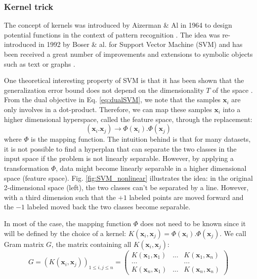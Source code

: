 \subsubsection{Kernel trick}
The concept of kernels was introduced by Aizerman \& Al in 1964 to design potential functions in the context of pattern recognition \cite{Aizerman1964}. The idea was re-introduced in 1992 by Boser \& al. for Support Vector Machine (SVM) and has been received a great number of improvements and extensions to symbolic objects such as text or graphs \cite{Boser1992}.

One theoretical interesting property of SVM is that it has been shown that the generalization error bound does not depend on the dimensionality $T$ of the space \cite{Schlkopf2013}. From the dual objective in Eq. \ref{eq:dualSVM}, we note that the samples $\textbf{x}_i$ are only involves in a dot-product. Therefore, we can map these samples $\textbf{x}_i$ into a higher dimensional hyperspace, called the feature space, through the replacement:
\begin{equation}
	(\textbf{x}_i . \textbf{x}_j) \rightarrow \Phi(\textbf{x}_i) . \Phi(\textbf{x}_j) 
\end{equation}
\noindent where $\Phi$ is the mapping function. The intuition behind is that for many datasets, it is not possible to find a hyperplan that can separate the two classes in the input space if the problem is not linearly separable. However, by applying a transformation $\Phi$, data might become linearly separable in a higher dimensional space (feature space). Fig. \ref{fig:SVM_nonlinear} illustrates the idea: in the original 2-dimensional space (left), the two classes can't be separated by a line. However, with a third dimension such that the $+1$ labeled points are moved forward and the $-1$ labeled moved back the two classes become separable.

In most of the case, the mapping function $\Phi$ does not need to be known since it will be defined by the choice of a kernel: $K(\textbf{x}_i,\textbf{x}_j)= \Phi(\textbf{x}_i) . \Phi(\textbf{x}_j)$. We call Gram matrix $G$, the matrix containing all $K(\textbf{x}_i,\textbf{x}_j)$:
\begin{equation*}
	G = (K(\textbf{x}_i,\textbf{x}_j))_{1 \leq i,j \leq n} = 
	\begin{pmatrix}
	K(\textbf{x}_1,\textbf{x}_1) & ... & K(\textbf{x}_1,\textbf{x}_n) \\
	... & & ... \\
	K(\textbf{x}_n,\textbf{x}_1) & ... & K(\textbf{x}_n,\textbf{x}_n) 
	\end{pmatrix}
\end{equation*}


